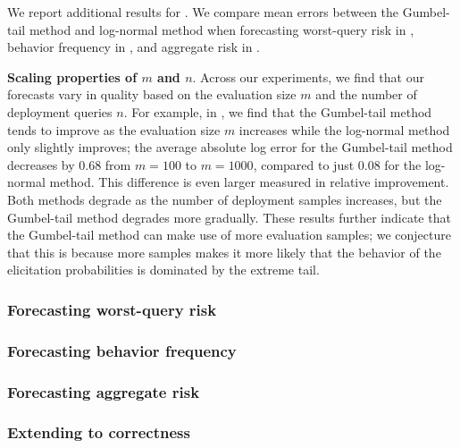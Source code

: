 We report additional results for . We compare mean errors between the Gumbel-tail method and log-normal method when forecasting worst-query risk in , behavior frequency in , and aggregate risk in .

\textbf{Scaling properties of $m$ and $n$}. Across our experiments, we find that our forecasts vary in quality based on the evaluation size $m$ and the number of deployment queries $n$.
For example, in , we find that the Gumbel-tail method tends to improve as the evaluation size $m$ increases while the log-normal method only slightly improves; the average absolute log error for the Gumbel-tail method decreases by 0.68 from $m = 100$ to $m = 1000$, compared to just 0.08 for the log-normal method. This difference is even larger measured in relative improvement. Both methods degrade as the number of deployment samples increases, but the Gumbel-tail method degrades more gradually. These results further indicate that the Gumbel-tail method can make use of more evaluation samples; we conjecture that this is because more samples makes it more likely that the behavior of the elicitation probabilities is dominated by the extreme tail. 

\subsubsection{Forecasting worst-query risk}
\label{sec:misuse-worst-query-risk}


\vspace{-0.7em}
\subsubsection{Forecasting behavior frequency}
\label{sec:misuse-behavior-frequency}



\subsubsection{Forecasting aggregate risk}
\label{sec:misuse-aggregate-risk}



\newpage


\subsubsection{Extending to correctness}
\label{sec:misuse-correctness-appendices}

